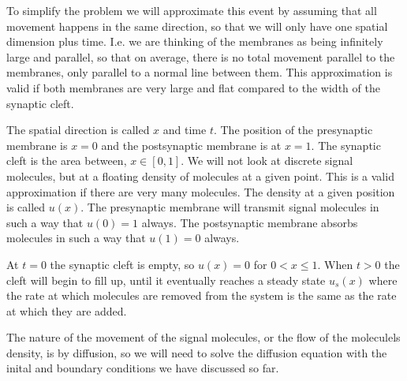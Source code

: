 To simplify the problem we will approximate this event by assuming
that all movement happens in the same direction, so that we will
only have one spatial dimension plus time. I.e. we are thinking of
the membranes as being infinitely large and parallel, so that on
average, there is no total movement parallel to the membranes, only
parallel to a normal line between them. This approximation is valid
if both membranes are very large and flat compared to the width of
the synaptic cleft.

The spatial direction is called $x$ and time $t$. The position of
the presynaptic membrane is $x=0$ and the postsynaptic membrane is
at $x=1$. The synaptic cleft is the area between, $x \in [0,1]$. We
will not look at discrete signal molecules, but at a floating
density of molecules at a given point. This is a valid
approximation if there are very many molecules. The density at a
given position is called $u(x)$. The presynaptic membrane will
transmit signal molecules in such a way that $u(0)=1$ always. The
postsynaptic membrane absorbs molecules in such a way that $u(1)=0$
always.

At $t=0$ the synaptic cleft is empty, so $u(x)=0$  for $0 < x \leq
1$. When $t > 0$ the cleft will begin to fill up, until it
eventually reaches a steady state $u_s(x)$ where the rate at which molecules
are removed from the system is the same as the rate at which they
are added.

The nature of the movement of the signal molecules, or the flow of the 
moleculels density, is by diffusion, so we will need to solve the diffusion 
equation with the inital and boundary conditions we have discussed so far.
